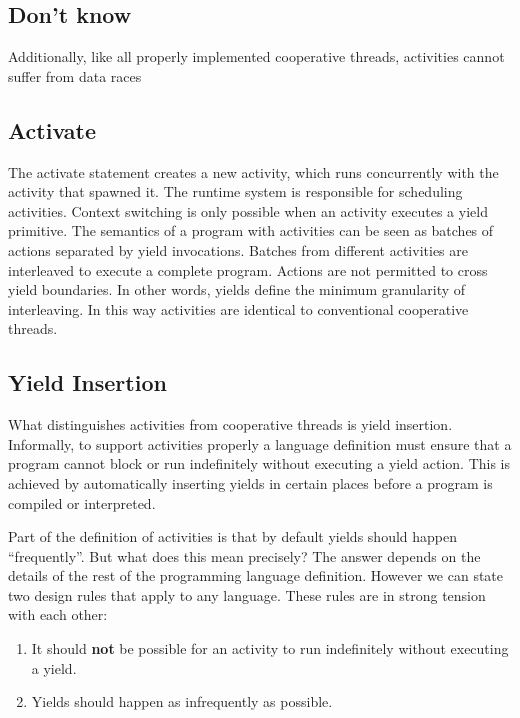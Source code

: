 \documentclass[10pt,preprint]{sigplanconf}
\begin{document}
\subsection{Don't know}

Additionally, like all properly implemented cooperative threads, activities cannot suffer from data races

\cite{Boehm2011}

\subsection{Activate}

The activate statement creates a new activity, which runs concurrently with the activity that spawned it.
The runtime system is responsible for scheduling activities.
Context switching is only possible when an activity executes a yield primitive.
The semantics of a program with activities can be seen as batches of actions separated by yield invocations.
Batches from different activities are interleaved to execute a complete program.
Actions are not permitted to cross yield boundaries.
In other words, yields define the minimum granularity of interleaving.
In this way activities are identical to conventional cooperative threads.

\subsection{Yield Insertion}

What distinguishes activities from cooperative threads is yield insertion.
Informally, to support activities properly a language definition must ensure that a program cannot block or run indefinitely without executing a yield action.
This is achieved by automatically inserting yields in certain places before a program is compiled or interpreted.



Part of the definition of activities is that by default yields should happen ``frequently''.
But what does this mean precisely?
The answer depends on the details of the rest of the programming language definition.
However we can state two design rules that apply to any language.
These rules are in strong tension with each other:

\begin{enumerate}
\item It should \textbf{not} be possible for an activity to run indefinitely without executing a yield.
\item Yields should happen as infrequently as possible.
\end{enumerate}
\end{document}
